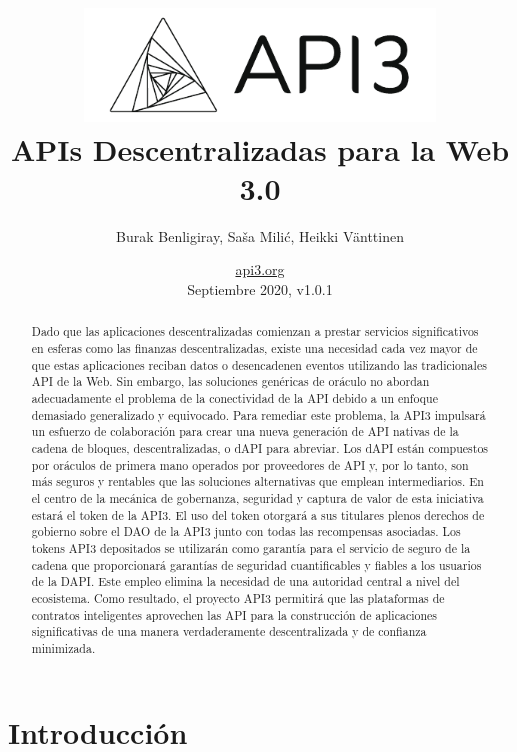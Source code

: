 \documentclass[11pt]{article}
\title{\includegraphics[width=0.7\textwidth]{fig/api3.pdf} \\ APIs Descentralizadas para la Web 3.0}
\author{Burak Benligiray, Sa\v{s}a Mili\'{c}, Heikki Vänttinen}
\date{\href{https://api3.org}{api3.org} \\ \medskip Septiembre 2020, v1.0.1}
\begin{document}

\maketitle

\begin{abstract}
\noindent 
Dado que las aplicaciones descentralizadas comienzan a prestar servicios significativos en esferas como las finanzas descentralizadas, existe una necesidad cada vez mayor de que estas aplicaciones reciban datos o desencadenen eventos utilizando las tradicionales API de la Web. Sin embargo, las soluciones genéricas de oráculo no abordan adecuadamente el problema de la conectividad de la API debido a un enfoque demasiado generalizado y equivocado. Para remediar este problema, la API3 impulsará un esfuerzo de colaboración para crear una nueva generación de API nativas de la cadena de bloques, descentralizadas, o dAPI para abreviar. Los dAPI están compuestos por oráculos de primera mano operados por proveedores de API y, por lo tanto, son más seguros y rentables que las soluciones alternativas que emplean intermediarios.  En el centro de la mecánica de gobernanza, seguridad y captura de valor de esta iniciativa estará el token de la API3.  El uso del token otorgará a sus titulares plenos derechos de gobierno sobre el DAO de la API3 junto con todas las recompensas asociadas.  Los tokens API3 depositados se utilizarán como garantía para el servicio de seguro de la cadena que proporcionará garantías de seguridad cuantificables y fiables a los usuarios de la DAPI.  Este empleo elimina la necesidad de una autoridad central a nivel del ecosistema.  Como resultado, el proyecto API3 permitirá que las plataformas de contratos inteligentes aprovechen las API para la construcción de aplicaciones significativas de una manera verdaderamente descentralizada y de confianza minimizada.
\end{abstract}

\newpage
{}
\setcounter{page}{2}
\renewcommand{\contentsname}{} %
\tableofcontents


\newpage
{}
\setcounter{page}{1}

\section{Introducción}
\label{sec:introduction}
\end{document}
